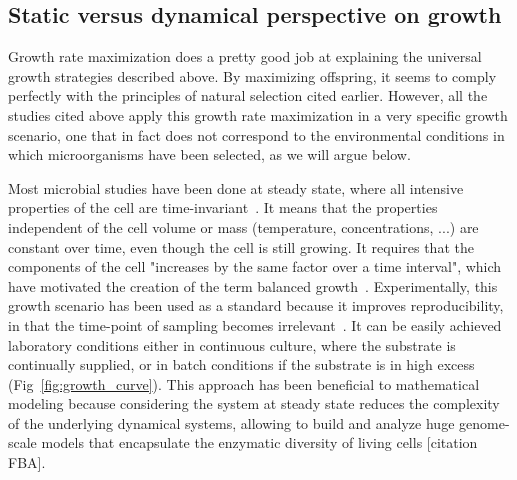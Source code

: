 \subsection{Static versus dynamical perspective on growth}

Growth rate maximization does a pretty good job at explaining the universal growth strategies described above.
By maximizing offspring, it seems to comply perfectly with the principles of natural selection cited earlier.
However, all the studies cited above apply this growth rate maximization in a very specific growth scenario, one that in fact does not correspond to the environmental conditions in which microorganisms have been selected, as we will argue below.

Most microbial studies have been done at steady state, where all intensive properties of the cell are time-invariant~\cite{schaechter_microbe_2006,fishov_microbial_1995}.
It means that the properties independent of the cell volume or mass (temperature, concentrations, ...) are constant over time, even though the cell is still growing.
It requires that the components of the cell "increases by the same factor over a time interval", which have motivated the creation of the term balanced growth~\cite{campbell_synchronization_1957}.
Experimentally, this growth scenario has been used as a standard because it improves reproducibility, in that the time-point of sampling becomes irrelevant~\cite{schaechter_microbe_2006}.
It can be easily achieved laboratory conditions either in continuous culture, where the substrate is continually supplied, or in batch conditions if the substrate is in high excess (Fig~\ref{fig:growth_curve}).
This approach has been beneficial to mathematical modeling because considering the system at steady state reduces the complexity of the underlying dynamical systems, allowing to build and analyze huge genome-scale models that encapsulate the enzymatic diversity of living cells [citation FBA].

